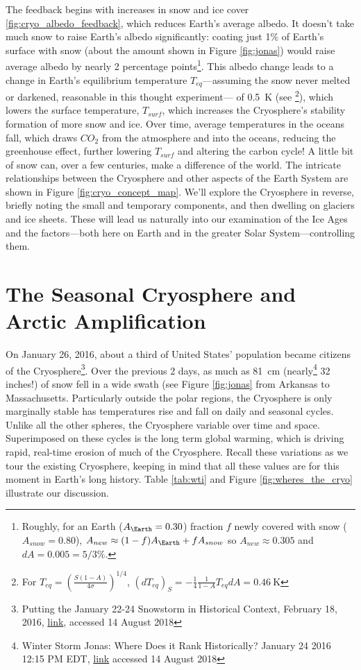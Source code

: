 The feedback begins with increases in snow and ice cover \ref{fig:cryo_albedo_feedback}, which reduces Earth's average albedo. It doesn't take much snow to raise Earth's albedo significantly: coating just 1\% of Earth's surface with snow (about the amount shown in Figure \ref{fig:jonas}) would raise average albedo by nearly 2 percentage points\footnote{Roughly, for an Earth ($A_\Earth=0.30$) fraction $f$ newly covered with snow ($A_{snow}=0.80$), $A_{new} \approx (1-f)A_\Earth+fA_{snow}$ so $A_{new} \approx 0.305$ and $dA=0.005=5/3\%$.}. This albedo change leads to a change in Earth's equilibrium temperature $T_{eq}$---assuming the snow never melted or darkened, reasonable in this thought experiment--- of \SI{0.5}{K} (see \footnote{For $T_{eq}=\left(\frac{S(1-A)}{4\sigma}\right)^{1/4}$, $\left(dT_{eq}\right)_S=-\frac{1}{4}\frac{1}{1-A}T_{eq}dA=\SI{0.46}{\kelvin}$}), which lowers the surface temperature, $T_{surf}$, which increases the Cryosphere's stability formation of more snow and ice. Over time, average temperatures in the oceans fall, which draws $CO_2$ from the atmosphere and into the oceans, reducing the greenhouse effect, further lowering $T_{surf}$ and altering the carbon cycle! A little bit of snow can, over a few centuries, make a difference of the world. The intricate relationships between the Cryosphere and other aspects of the Earth System are shown in Figure \ref{fig:cryo_concept_map}. We'll explore the Cryosphere in reverse, briefly noting the small and temporary components, and then dwelling on glaciers and ice sheets. These will lead us naturally into our examination of the Ice Ages and the factors---both here on Earth and in the greater Solar System---controlling them. 

 

 
\section{The Seasonal Cryosphere and Arctic Amplification}  \label{Arctic Amplification}
On January 26, 2016, about a third of United States' population became citizens of the Cryosphere\footnote{Putting the January 22-24 Snowstorm in Historical Context, February 18, 2016, \href{https://www.ncdc.noaa.gov/news/january-22-24-2016-snowstorm-in-historical-context}{link}, accessed 14 August 2018}. Over the previous 2 days, as much as \SI{81}{\centi\metre} (nearly\footnote{Winter Storm Jonas: Where Does it Rank Historically? January 24 2016 12:15 PM EDT, \href{https://weather.com/storms/winter/news/winter-storm-jonas-rank-in-history}{link} accessed 14 August 2018} 32 inches!) of snow fell in a wide swath (see Figure \ref{fig:jonas} from Arkansas to Massachusetts. Particularly outside the polar regions, the Cryosphere is only marginally stable has temperatures rise and fall on daily and seasonal cycles. Unlike all the other spheres, the Cryosphere variable over time and space. Superimposed on these cycles is the long term global warming, which is driving rapid, real-time erosion of much of the Cryosphere. Recall these variations as we tour the existing Cryosphere, keeping in mind that all these values are for this moment in Earth's long history. Table \ref{tab:wti} and Figure \ref{fig:wheres_the_cryo} illustrate our discussion.
